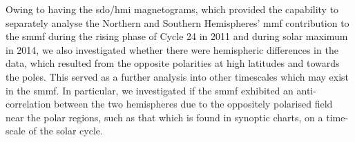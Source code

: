 %
%
%
%	
%	
%	
%	
%
%	
%
%
%
%	
%	
%	
%	
%	
%	
%
%
%
%
%


Owing to having the \gls{sdo/hmi} magnetograms, which provided the capability to separately analyse the Northern and Southern Hemispheres' \gls{mmf} contribution to the \gls{smmf} during the rising phase of Cycle 24 in 2011 and during solar maximum in 2014, we also investigated whether there were hemispheric differences in the data, which resulted from the opposite polarities at high latitudes and towards the poles. This served as a further analysis into other timescales which may exist in the \gls{smmf}. In particular, we investigated if the \gls{smmf} exhibited an anti-correlation between the two hemispheres due to the oppositely polarised field near the polar regions, such as that which is found in synoptic charts, on a time-scale of the solar cycle.


